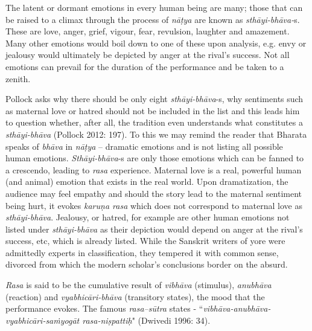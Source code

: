 The latent or dormant emotions in every human being are many; those that can be raised to a climax through the process of \textit{nāṭya} are known as \textit{sthāyi-bhāva-}s. These are love, anger, grief, vigour, fear, revulsion, laughter and amazement. Many other emotions would boil down to one of these upon analysis, e.g. envy or jealousy would ultimately be depicted by anger at the rival’s success. Not all emotions can prevail for the duration of the performance and be taken to a zenith.

Pollock asks why there should be only eight \textit{sthāyi-bhāva}-s, why sentiments such as maternal love or hatred should not be included in the list and this leads him to question whether, after all, the tradition even understands what constitutes a \textit{sthāyi-bhāva }(Pollock 2012: 197). To this we may remind the reader that Bharata speaks of \textit{bhāva} in \textit{nāṭya} – dramatic emotions and is not listing all possible human emotions. \textit{Sthāyi-bhāva}-s are only those emotions which can be fanned to a crescendo, leading to \textit{rasa} experience. Maternal love is a real, powerful human (and animal) emotion that exists in the real world. Upon dramatization, the audience may feel empathy and should the story lead to the maternal sentiment being hurt, it evokes \textit{karuṇa rasa} which does not correspond to maternal love as \textit{sthāyi-bhāva}. Jealousy, or hatred, for example are other human emotions not listed under \textit{sthāyi-bhāva} as their depiction would depend on anger at the rival’s success, etc, which is already listed. While the Sanskrit writers of yore were admittedly experts in classification, they tempered it with common sense, divorced from which the modern scholar’s conclusions border on the absurd.

\textit{Rasa} is said to be the cumulative result of \textit{vibhāva} (stimulus), \textit{anubhāva} (reaction) and \textit{vyabhicāri-bhāva} (transitory states), the mood that the performance evokes. The famous \textit{rasa--sūtra} states - “\textit{vibhāva-anubhāva-vyabhicāri-saṁyogāt rasa-niṣpattiḥ}" (Dwivedi 1996: 34).

